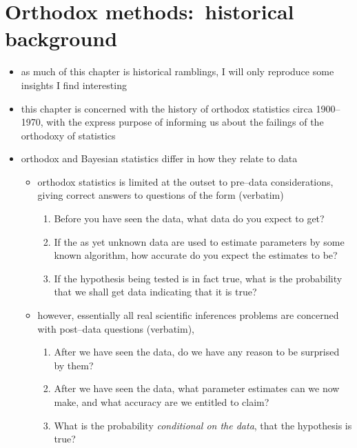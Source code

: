 \documentclass[../jaynes_prob_theory_notes.tex]{subfiles}
\begin{document}
    \section{Orthodox methods:\ historical background}
        \begin{itemize} 
            \item as much of this chapter is historical ramblings, I will only reproduce some insights I find interesting
            \item this chapter is concerned with the history of orthodox statistics circa 1900--1970, with the express purpose of informing us about the failings of the orthodoxy of statistics
            \item orthodox and Bayesian statistics differ in how they relate to data
                \begin{itemize} 
                    \item orthodox statistics is limited at the outset to pre--data considerations, giving correct answers to questions of the form (verbatim)
                        \begin{enumerate}
                            \item Before you have seen the data, what data do you expect to get?
                            \item If the as yet unknown data are used to estimate parameters by some known algorithm, how accurate do you expect the estimates to be?
                            \item If the hypothesis being tested is in fact true, what is the probability that we shall get data indicating that it is true?
                        \end{enumerate}
                    \item however, essentially all real scientific inferences problems are concerned with post--data questions (verbatim),
                        \begin{enumerate}
                            \item After we have seen the data, do we have any reason to be surprised by them?
                            \item After we have seen the data, what parameter estimates can we now make, and what accuracy are we entitled to claim?
                            \item What is the probability \textit{conditional on the data}, that the hypothesis is true?
                        \end{enumerate}
                \end{itemize}
        \end{itemize}
            
\end{document}
